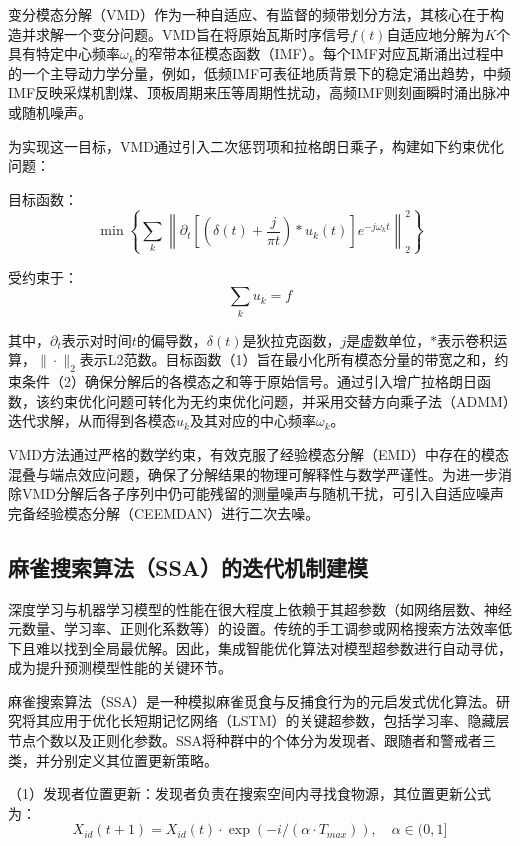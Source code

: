 \documentclass[twocolumn,a4paper]{ctexart}
\numberwithin{equation}{section}
\begin{document}
变分模态分解（VMD）作为一种自适应、有监督的频带划分方法，其核心在于构造并求解一个变分问题。VMD旨在将原始瓦斯时序信号$f(t)$自适应地分解为$K$个具有特定中心频率$\omega_k$的窄带本征模态函数（IMF）。每个IMF对应瓦斯涌出过程中的一个主导动力学分量，例如，低频IMF可表征地质背景下的稳定涌出趋势，中频IMF反映采煤机割煤、顶板周期来压等周期性扰动，高频IMF则刻画瞬时涌出脉冲或随机噪声。

为实现这一目标，VMD通过引入二次惩罚项和拉格朗日乘子，构建如下约束优化问题：

目标函数：
\begin{equation}
\min \left\{ \sum_k \left\| \partial_t \left[ \left( \delta(t) + \frac{j}{\pi t} \right) * u_k(t) \right] e^{-j\omega_k t} \right\|_2^2 \right\}
\end{equation}

受约束于：
\begin{equation}
\sum_k u_k = f
\end{equation}

其中，$\partial_t$表示对时间$t$的偏导数，$\delta(t)$是狄拉克函数，$j$是虚数单位，$*$表示卷积运算，$\|\cdot\|_2$表示L2范数。目标函数（1）旨在最小化所有模态分量的带宽之和，约束条件（2）确保分解后的各模态之和等于原始信号。通过引入增广拉格朗日函数，该约束优化问题可转化为无约束优化问题，并采用交替方向乘子法（ADMM）迭代求解，从而得到各模态$u_k$及其对应的中心频率$\omega_k$。

VMD方法通过严格的数学约束，有效克服了经验模态分解（EMD）中存在的模态混叠与端点效应问题，确保了分解结果的物理可解释性与数学严谨性。为进一步消除VMD分解后各子序列中仍可能残留的测量噪声与随机干扰，可引入自适应噪声完备经验模态分解（CEEMDAN）进行二次去噪。

\subsection{麻雀搜索算法（SSA）的迭代机制建模}

深度学习与机器学习模型的性能在很大程度上依赖于其超参数（如网络层数、神经元数量、学习率、正则化系数等）的设置。传统的手工调参或网格搜索方法效率低下且难以找到全局最优解。因此，集成智能优化算法对模型超参数进行自动寻优，成为提升预测模型性能的关键环节。

麻雀搜索算法（SSA）是一种模拟麻雀觅食与反捕食行为的元启发式优化算法。研究将其应用于优化长短期记忆网络（LSTM）的关键超参数，包括学习率、隐藏层节点个数以及正则化参数。SSA将种群中的个体分为发现者、跟随者和警戒者三类，并分别定义其位置更新策略。

（1）发现者位置更新：发现者负责在搜索空间内寻找食物源，其位置更新公式为：
\begin{equation}
X_{id}(t+1) = X_{id}(t) \cdot \exp(-i/(\alpha \cdot T_{max})), \quad \alpha \in (0,1]
\end{equation}
\end{document}
